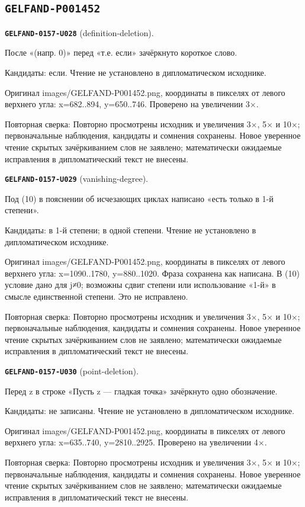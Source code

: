 \subsection*{\texttt{GELFAND-P001452}}
\par\noindent\leavevmode{}\label{GELFAND-0157-U028}\label{GELFAND-P001452:definition-deletion}\textbf{\texttt{GELFAND-0157-U028}} (definition-deletion).\nopagebreak[4]\par
После «(напр. 0)» перед «т.е. если» зачёркнуто короткое слово.\par
Кандидаты: если. Чтение не установлено в дипломатическом исходнике.\par
Оригинал images/GELFAND-P001452.png, координаты в пикселях от левого верхнего угла: x=682..894, y=650..746. Проверено на увеличении 3×.\par
Повторная сверка: Повторно просмотрены исходник и увеличения 3×, 5× и 10×; первоначальные наблюдения, кандидаты и сомнения сохранены. Новое уверенное чтение скрытых зачёркиванием слов не заявлено; математически ожидаемые исправления в дипломатический текст не внесены.\par\medskip
\par\noindent\leavevmode{}\label{GELFAND-0157-U029}\label{GELFAND-P001452:vanishing-degree}\textbf{\texttt{GELFAND-0157-U029}} (vanishing-degree).\nopagebreak[4]\par
Под (10) в пояснении об исчезающих циклах написано «есть только в 1-й степени».\par
Кандидаты: в 1-й степени; в одной степени. Чтение не установлено в дипломатическом исходнике.\par
Оригинал images/GELFAND-P001452.png, координаты в пикселях от левого верхнего угла: x=1090..1780, y=880..1020. Фраза сохранена как написана. В (10) условие дано для j≠0; возможны сдвиг степени или использование «1-й» в смысле единственной степени. Это не исправлено.\par
Повторная сверка: Повторно просмотрены исходник и увеличения 3×, 5× и 10×; первоначальные наблюдения, кандидаты и сомнения сохранены. Новое уверенное чтение скрытых зачёркиванием слов не заявлено; математически ожидаемые исправления в дипломатический текст не внесены.\par\medskip
\par\noindent\leavevmode{}\label{GELFAND-0157-U030}\label{GELFAND-P001452:point-deletion}\textbf{\texttt{GELFAND-0157-U030}} (point-deletion).\nopagebreak[4]\par
Перед z в строке «Пусть z — гладкая точка» зачёркнуто одно обозначение.\par
Кандидаты: не записаны. Чтение не установлено в дипломатическом исходнике.\par
Оригинал images/GELFAND-P001452.png, координаты в пикселях от левого верхнего угла: x=635..740, y=2810..2925. Проверено на увеличении 4×.\par
Повторная сверка: Повторно просмотрены исходник и увеличения 3×, 5× и 10×; первоначальные наблюдения, кандидаты и сомнения сохранены. Новое уверенное чтение скрытых зачёркиванием слов не заявлено; математически ожидаемые исправления в дипломатический текст не внесены.\par\medskip
